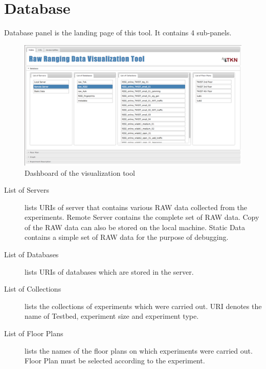 \documentclass[11pt,a4paper,headinclude,footinclude,chapterprefix=on]{scrreprt}
\begin{document}
\section{Database} 
Database panel is the landing page of this tool. It contains 4 sub-panels. 
\begin{figure}
	[!] \centering 
	\includegraphics[width=15cm]{Images/tool_db.png} \caption{Dashboard of the visualization tool} \label{fig:tool:db} 
\end{figure}
\begin{description}
\item[List of Servers] lists URIs of server that contains various RAW data collected from the experiments. Remote Server contains the complete set of RAW data. Copy of the RAW data can also be stored on the local machine. Static Data contains a simple set of RAW data for the purpose of debugging. 
\item[List of Databases] lists URIs of databases which are stored in the server. 
\item[List of Collections] lists the collections of experiments which were carried out. URI denotes the name of Testbed, experiment size and experiment type.
\item[List of Floor Plans] lists the names of the floor plans on which experiments were carried out. Floor Plan must be selected according to the experiment. 
\end{description}
\end{document}
